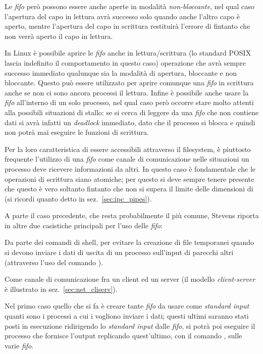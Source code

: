 Le \textit{fifo} però possono essere anche aperte in modalità
\textsl{non-bloccante}, nel qual caso l'apertura del capo in lettura avrà
successo solo quando anche l'altro capo è aperto, mentre l'apertura del capo
in scrittura restituirà l'errore di  fintanto che non verrà
aperto il capo in lettura.

In Linux è possibile aprire le \textit{fifo} anche in lettura/scrittura (lo
standard POSIX lascia indefinito il comportamento in questo caso) operazione
che avrà sempre successo immediato qualunque sia la modalità di apertura,
bloccante e non bloccante.  Questo può essere utilizzato per aprire comunque
una \textit{fifo} in scrittura anche se non ci sono ancora processi il
lettura. Infine è possibile anche usare la \textit{fifo} all'interno di un
solo processo, nel qual caso però occorre stare molto attenti alla possibili
situazioni di stallo: se si cerca di leggere da una \textit{fifo} che non
contiene dati si avrà infatti un \textit{deadlock} immediato, dato che il
processo si blocca e quindi non potrà mai eseguire le funzioni di scrittura.

Per la loro caratteristica di essere accessibili attraverso il filesystem, è
piuttosto frequente l'utilizzo di una \textit{fifo} come canale di
comunicazione nelle situazioni un processo deve ricevere informazioni da
altri. In questo caso è fondamentale che le operazioni di scrittura siano
atomiche; per questo si deve sempre tenere presente che questo è vero soltanto
fintanto che non si supera il limite delle dimensioni di  (si
ricordi quanto detto in sez.~\ref{sec:ipc_pipes}).

A parte il caso precedente, che resta probabilmente il più comune, Stevens
riporta in \cite{APUE} altre due casistiche principali per l'uso delle
\textit{fifo}:
\begin{itemize*}
\item Da parte dei comandi di shell, per evitare la creazione di file
  temporanei quando si devono inviare i dati di uscita di un processo
  sull'input di parecchi altri (attraverso l'uso del comando ).  
\item Come canale di comunicazione fra un client ed un
  server (il modello \textit{client-server} è illustrato in
  sez.~\ref{sec:net_cliserv}).
\end{itemize*}

Nel primo caso quello che si fa è creare tante \textit{fifo} da usare come
\textit{standard input} quanti sono i processi a cui i vogliono inviare i
dati; questi ultimi saranno stati posti in esecuzione ridirigendo lo
\textit{standard input} dalle \textit{fifo}, si potrà poi eseguire il processo
che fornisce l'output replicando quest'ultimo, con il comando , sulle
varie \textit{fifo}.

